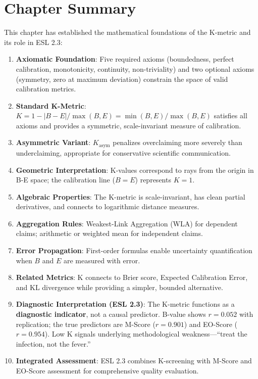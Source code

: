 \documentclass[11pt,a4paper]{article}
\theoremstyle{remark}
\begin{document}
\section{Chapter Summary}
\label{sec:summary}

This chapter has established the mathematical foundations of the K-metric and its role in ESL 2.3:

\begin{enumerate}
    \item \textbf{Axiomatic Foundation}: Five required axioms (boundedness, perfect calibration, monotonicity, continuity, non-triviality) and two optional axioms (symmetry, zero at maximum deviation) constrain the space of valid calibration metrics.

    \item \textbf{Standard K-Metric}: $K = 1 - |B - E| / \max(B, E) = \min(B, E) / \max(B, E)$ satisfies all axioms and provides a symmetric, scale-invariant measure of calibration.

    \item \textbf{Asymmetric Variant}: $K_{\text{asym}}$ penalizes overclaiming more severely than underclaiming, appropriate for conservative scientific communication.

    \item \textbf{Geometric Interpretation}: K-values correspond to rays from the origin in B-E space; the calibration line ($B = E$) represents $K = 1$.

    \item \textbf{Algebraic Properties}: The K-metric is scale-invariant, has clean partial derivatives, and connects to logarithmic distance measures.

    \item \textbf{Aggregation Rules}: Weakest-Link Aggregation (WLA) for dependent claims; arithmetic or weighted mean for independent claims.

    \item \textbf{Error Propagation}: First-order formulas enable uncertainty quantification when $B$ and $E$ are measured with error.

    \item \textbf{Related Metrics}: K connects to Brier score, Expected Calibration Error, and KL divergence while providing a simpler, bounded alternative.

    \item \textbf{Diagnostic Interpretation (ESL 2.3)}: The K-metric functions as a \textbf{diagnostic indicator}, not a causal predictor. B-value shows $r = 0.052$ with replication; the true predictors are M-Score ($r = 0.901$) and EO-Score ($r = 0.954$). Low K signals underlying methodological weakness---``treat the infection, not the fever.''

    \item \textbf{Integrated Assessment}: ESL 2.3 combines K-screening with M-Score and EO-Score assessment for comprehensive quality evaluation.
\end{enumerate}
\end{document}
